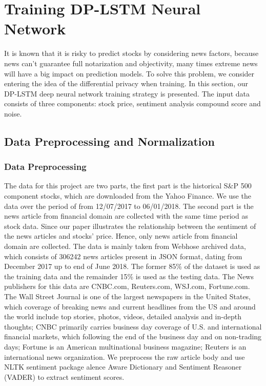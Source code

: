 \documentclass{article}
\begin{document}
\section{Training DP-LSTM Neural Network}
\label{headings}


It is known that it is risky to predict stocks by considering news factors, because news can't guarantee full notarization and objectivity, many times extreme news will have a big impact on prediction models. To solve this problem, we consider entering the idea of the differential privacy when training. In this section, our DP-LSTM deep neural network training strategy is presented. The input data consists of three components: stock price, sentiment analysis compound score and noise. 


\subsection{Data Preprocessing and Normalization}


\subsubsection{Data Preprocessing}


The data for this project are two parts, the first part is the historical S\&P 500 component stocks, which are downloaded from the Yahoo Finance. We use the data over the period of from 12/07/2017 to 06/01/2018. The second part is the news article from financial domain are collected with the same time period as stock data. Since our paper illustrates the relationship between the sentiment of the news articles and stocks' price. Hence,  only news article from financial domain are collected. 
The data is mainly taken from Webhose archived data, which consists of 306242 news articles present in JSON format, dating from December 2017 up to end of June 2018. The former 85\% of the dataset is used as the training data and the remainder 15\% is used as the testing data.
The News publishers for this data are CNBC.com, Reuters.com, WSJ.com, Fortune.com. The Wall Street Journal is one of the largest newspapers in the United States, which coverage of breaking news and current headlines from the US and around the world include top stories, photos, videos, detailed analysis and in-depth thoughts; CNBC primarily carries business day coverage of U.S. and international financial markets, which following the end of the business day and on non-trading days; Fortune is an American multinational business magazine; Reuters is an international news organization. We preprocess the raw article body and use NLTK sentiment package alence Aware Dictionary and Sentiment Reasoner (VADER) to extract sentiment scores.
\end{document}
